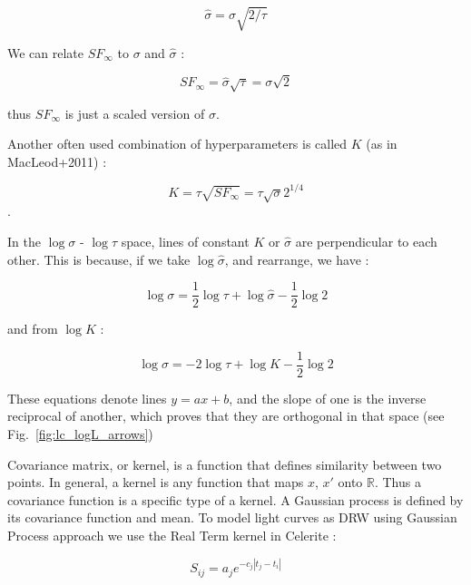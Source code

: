 \documentclass[fleqn,usenatbib]{mnras}  %
\begin{document}
\begin{equation}
\hat{\sigma} = \sigma \sqrt{2 / \tau}
\end{equation} 

We can relate $SF_{\infty}$ to $\sigma$ and $\hat{\sigma}$ : 

\begin{equation}
SF_{\infty} = \hat{\sigma} \sqrt{\tau} = \sigma \sqrt{2}
\end{equation} 

thus $SF_{\infty}$ is just a scaled version of $\sigma$. 

Another often used combination of hyperparameters is called $K$ (as in MacLeod+2011) : 

\begin{equation}
K = \tau \sqrt{SF_{\infty} }= \tau \sqrt{\sigma} 2^{1/4} 
\end{equation}.  

In the $\log{\sigma}$ - $\log{\tau}$ space, lines of constant $K$ or $\hat{\sigma}$ are perpendicular to each other.  This is because, if we take $\log{\hat{\sigma}}$, and rearrange, we have  : 

\begin{equation}
\log{\sigma} = \frac{1}{2} \log{\tau} + \log{\hat{\sigma}} - \frac{1}{2} \log{2}
\label{eq:sigma_hat_line}
\end{equation}

and from  $\log{K}$ : 

\begin{equation}
\log{\sigma} = -2 \log{\tau} + \log{K} - \frac{1}{2} \log{2}
\label{eq:K_line}
\end{equation}

These equations denote lines $y = ax + b$,  and the slope of one is the  inverse reciprocal of another, which proves that they are orthogonal in that space (see Fig.~\ref{fig:lc_logL_arrows})

Covariance matrix, or kernel, is a function that defines similarity between two points. In general, a kernel is any function that maps $x$, $x'$ onto $\mathbb{R}$. Thus a covariance function is a specific type of a kernel.   A Gaussian process is defined by its covariance function and mean. To model light curves as DRW using Gaussian Process approach we use the Real Term kernel in Celerite : 

\begin{equation}
S_{ij} = a_{j} e^ {-c_{j} | t_{j} - t_{i}|}
\end{equation}
\end{document}
